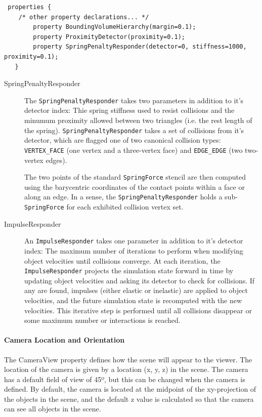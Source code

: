 \begin{verbatim}
 properties { 
	/* other property declarations... */
        property BoundingVolumeHierarchy(margin=0.1);
        property ProximityDetector(proximity=0.1);
        property SpringPenaltyResponder(detector=0, stiffness=1000, proximity=0.1);
   }
\end{verbatim}
\begin{description}
\item[SpringPenaltyResponder] The \texttt{SpringPenaltyResponder}
  takes two parameters in addition to it's detector index: Thie spring
  stiffness used to resist collisions and the minumum proximity
  allowed between two triangles (i.e. the rest length of the
  spring). \texttt{SpringPenaltyResponder} takes a set of collisions
  from it's detector, which are flagged one of two canonical collision
  types: \texttt{VERTEX\_FACE} (one vertex and a three-vertex face)
  and \texttt{EDGE\_EDGE} (two two-vertex edges).

  The two points of the standard \texttt{SpringForce} stencil are then
  computed using the barycentric coordinates of the contact points
  within a face or along an edge. In a sense, the
  \texttt{SpringPenaltyResponder} holds a sub-\texttt{SpringForce} for
  each exhibited collision vertex set.

\item[ImpulseResponder] An \texttt{ImpulseResponder} takes one
  parameter in addition to it's detector index: The maximum number of
  iterations to perform when modifying object velocities until
  collisions converge. At each iteration, the
  \texttt{ImpulseResponder} projects the simulation state forward in
  time by updating object velocities and asking its detector to check
  for collisions. If any are found, impulses (either elastic or
  inelastic) are applied to object velocities, and the future
  simulation state is recomputed with the new velocities. This
  iterative step is performed until all collisions disappear or some
  maximum number or interactions is reached.
\end{description}

\paragraph{Camera Location and Orientation}

The CameraView property defines how the scene will appear to the
viewer. The location of the camera is given by a location (x, y, z) in
the scene. The camera has a default field of view of 45º, but this can
be changed when the camera is defined. By default, the camera is
located at the midpoint of the xy-projection of the objects in the
scene, and the default z value is calculated so that the camera can
see all objects in the scene.

